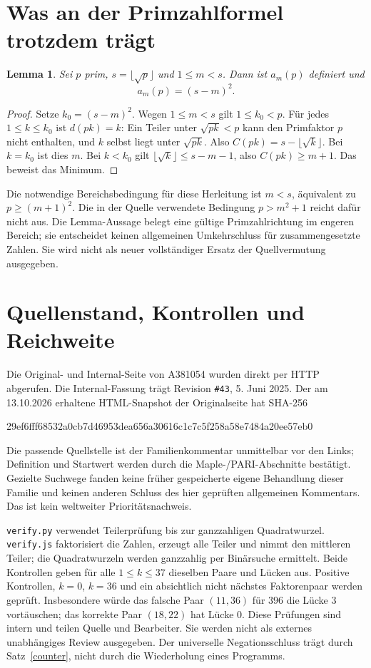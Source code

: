 \documentclass[11pt,a4paper]{article}
\newtheorem{lemma}{Lemma}
\begin{document}
\section{Was an der Primzahlformel trotzdem trägt}
\begin{lemma}\label{prime}
Sei $p$ prim, $s=\lfloor\sqrt p\rfloor$ und $1\le m<s$.
Dann ist $a_m(p)$ definiert und
\[
 a_m(p)=(s-m)^2.
\]
\end{lemma}
\begin{proof}
Setze $k_0=(s-m)^2$. Wegen $1\le m<s$ gilt $1\le k_0<p$.
Für jedes $1\le k\le k_0$ ist $d(pk)=k$: Ein Teiler unter
$\sqrt{pk}<p$ kann den Primfaktor $p$ nicht enthalten, und $k$ selbst liegt unter
$\sqrt{pk}$. Also $C(pk)=s-\lfloor\sqrt k\rfloor$.
Bei $k=k_0$ ist dies $m$. Bei $k<k_0$ gilt
$\lfloor\sqrt k\rfloor\le s-m-1$, also $C(pk)\ge m+1$.
Das beweist das Minimum.
\end{proof}
Die notwendige Bereichsbedingung für diese Herleitung ist $m<s$, äquivalent zu
$p\ge(m+1)^2$. Die in der Quelle verwendete Bedingung $p>m^2+1$ reicht dafür
nicht aus. Die Lemma-Aussage belegt eine gültige Primzahlrichtung im engeren Bereich;
sie entscheidet keinen allgemeinen Umkehrschluss für zusammengesetzte Zahlen.
Sie wird nicht als neuer vollständiger Ersatz der Quellvermutung ausgegeben.

\section{Quellenstand, Kontrollen und Reichweite}
Die Original- und Internal-Seite von A381054 wurden direkt per HTTP abgerufen.
Die Internal-Fassung trägt Revision \texttt{\#43}, 5. Juni 2025.
Der am 13.10.2026 erhaltene HTML-Snapshot der Originalseite hat SHA-256
\begin{center}\small\ttfamily
29ef6fff68532a0cb7d46953dea656a30616c1c7c5f258a58e7484a20ee57eb0
\end{center}
Die passende Quellstelle ist der Familienkommentar unmittelbar vor den Links;
Definition und Startwert werden durch die Maple-/PARI-Abschnitte bestätigt.
Gezielte Suchwege fanden keine früher gespeicherte eigene Behandlung dieser Familie
und keinen anderen Schluss des hier geprüften allgemeinen Kommentars. Das ist
kein weltweiter Prioritätsnachweis.

\texttt{verify.py} verwendet Teilerprüfung bis zur ganzzahligen Quadratwurzel.
\texttt{verify.js} faktorisiert die Zahlen, erzeugt alle Teiler und nimmt den mittleren
Teiler; die Quadratwurzeln werden ganzzahlig per Binärsuche ermittelt.
Beide Kontrollen geben für alle $1\le k\le37$ dieselben Paare und Lücken aus.
Positive Kontrollen, $k=0$, $k=36$ und ein absichtlich nicht nächstes Faktorenpaar
werden geprüft. Insbesondere würde das falsche Paar $(11,36)$ für $396$ die Lücke
$3$ vortäuschen; das korrekte Paar $(18,22)$ hat Lücke $0$.
Diese Prüfungen sind intern und teilen Quelle und Bearbeiter. Sie werden nicht
als externes unabhängiges Review ausgegeben. Der universelle Negationsschluss trägt
durch Satz~\ref{counter}, nicht durch die Wiederholung eines Programms.
\end{document}
